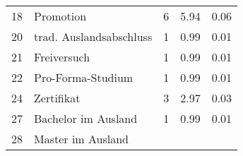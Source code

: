 \begin{longtable}{lXrrr}
     18 &
     \multicolumn{1}{X}{ Promotion   } &


       \num{6} &
       \num[round-mode=places,round-precision=2]{5,94} &
         \num[round-mode=places,round-precision=2]{0,06} \\

     20 &
     \multicolumn{1}{X}{ trad. Auslandsabschluss   } &


       \num{1} &
       \num[round-mode=places,round-precision=2]{0,99} &
         \num[round-mode=places,round-precision=2]{0,01} \\

     21 &
     \multicolumn{1}{X}{ Freiversuch   } &


       \num{1} &
       \num[round-mode=places,round-precision=2]{0,99} &
         \num[round-mode=places,round-precision=2]{0,01} \\

     22 &
     \multicolumn{1}{X}{ Pro-Forma-Studium   } &


       \num{1} &
       \num[round-mode=places,round-precision=2]{0,99} &
         \num[round-mode=places,round-precision=2]{0,01} \\

     24 &
     \multicolumn{1}{X}{ Zertifikat   } &


       \num{3} &
       \num[round-mode=places,round-precision=2]{2,97} &
         \num[round-mode=places,round-precision=2]{0,03} \\

     27 &
     \multicolumn{1}{X}{ Bachelor im Ausland   } &


       \num{1} &
       \num[round-mode=places,round-precision=2]{0,99} &
         \num[round-mode=places,round-precision=2]{0,01} \\

     28 &
     \multicolumn{1}{X}{ Master im Ausland   } &



\end{longtable}
